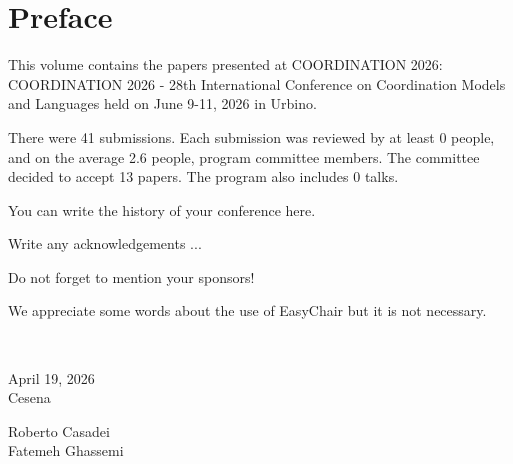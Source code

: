 \documentclass[]{llncs}
\begin{document}
\section*{Preface}
This volume contains the papers presented at COORDINATION 2026: COORDINATION 2026 - 28th International Conference on Coordination Models and Languages held on June 9-11, 2026 in Urbino.



There were 41 submissions. Each submission was reviewed by at least 0 people, and on the average 2.6 people, program committee members. The committee decided to accept 13 papers. The program also includes 0 talks.



You can write the history of your conference here.



Write any acknowledgements ...



Do not forget to mention your sponsors!



We appreciate some words about the use of EasyChair but it is not necessary.



~\bigskip

\noindent
\begin{minipage}[t]{.4\textwidth}
April 19, 2026\\
Cesena
\end{minipage}%
\hfill
\begin{minipage}[t]{.4\textwidth}\flushright
Roberto Casadei\\
Fatemeh Ghassemi
\end{minipage}

\clearpage
\end{document}
